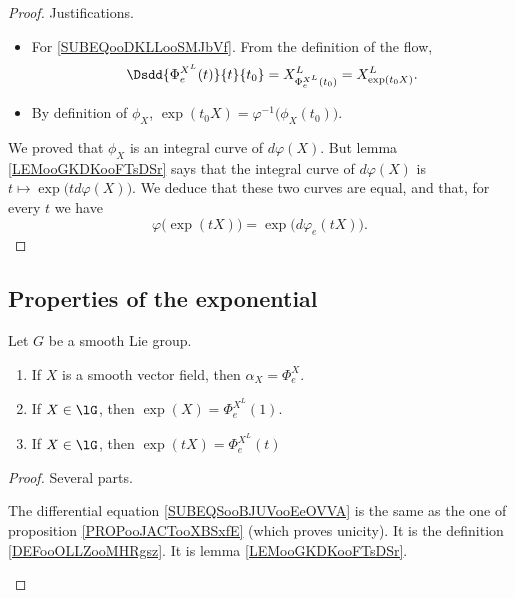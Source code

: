 \begin{proof}
	Justifications.
	\begin{itemize}
		\item For \eqref{SUBEQooDKLLooSMJbVf}. From the definition of the flow,
		      \begin{equation}
			      \Dsdd{ \Phi_e^{X^L}(t) }{t}{t_0}=X^{L}_{\Phi^{X^L}_e(t_0)}=X^L_{\exp(t_0X)}.
		      \end{equation}
		\item
		      By definition of \( \phi_X\), \( \exp(t_0X)=\varphi^{-1}\big( \phi_X(t_0) \big)\).
	\end{itemize}
	We proved that \( \phi_X\) is an integral curve of \( d\varphi(X)\). But lemma \ref{LEMooGKDKooFTsDSr} says that the integral curve of \( d\varphi(X)\) is \( t\mapsto \exp\big( td\varphi(X) \big)\). We deduce that these two curves are equal, and that, for every \( t\) we have
	\begin{equation}
		\varphi\big( \exp(tX) \big)=\exp\big( d\varphi_e(tX) \big).
	\end{equation}
\end{proof}

\subsection{Properties of the exponential}


\begin{proposition}	\label{PROPooPEFPooFvpxTe}
	Let \(  G\) be a smooth Lie group.
	\begin{enumerate}
		\item		\label{ITEMooKSGJooHdaZcR}
		      If \( X\) is a smooth vector field, then \( \alpha_X=\Phi_e^X \).
		\item		\label{ITEMooAFTTooHpaeJi}
		      If \( X\in \lG\), then \( \exp(X)=\Phi_e^{X^L}(1)\).
		\item	\label{ITEMooXRHDooTlrTYA}
		      If \( X\in\lG\), then \( \exp(tX)=\Phi_e^{X^L}(t)\)
	\end{enumerate}
\end{proposition}

\begin{proof}
	Several parts.
	\begin{subproof}
		The differential equation \eqref{SUBEQSooBJUVooEeOVVA} is the same as the one of proposition \ref{PROPooJACTooXBSxfE} (which proves unicity).
		It is the definition \ref{DEFooOLLZooMHRgsz}.
		It is lemma \ref{LEMooGKDKooFTsDSr}.
	\end{subproof}
\end{proof}


